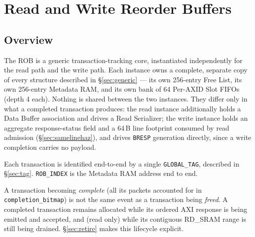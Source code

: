 \section{Read and Write Reorder Buffers}
\label{sec:rob}
\subsection{Overview}

The ROB is a generic transaction-tracking core, instantiated independently for the read path and the write path. Each instance owns a complete, separate copy of every structure described in \S\ref{sec:generic} --- its own 256-entry Free List, its own 256-entry Metadata RAM, and its own bank of 64 Per-AXID Slot FIFOs (depth 4 each). Nothing is shared between the two instances. They differ only in what a completed transaction produces: the read instance additionally holds a Data Buffer association and drives a Read Serializer; the write instance holds an aggregate response-status field and a 64\,B line footprint consumed by read admission (\S\ref{sec:samelinehaz}), and drives \texttt{BRESP} generation directly, since a write completion carries no payload.

Each transaction is identified end-to-end by a single \texttt{GLOBAL\_TAG}, described in \S\ref{sec:tag}.  \texttt{ROB\_INDEX} is the Metadata RAM address end to end.

A transaction becoming \emph{complete} (all its packets accounted for in \texttt{completion\_bitmap}) is not the same event as a transaction being \emph{freed}. A completed transaction remains allocated while its ordered AXI response is being emitted and accepted, and (read only) while its contiguous RD\_SRAM range is still being drained. \S\ref{sec:retire} makes this lifecycle explicit.

